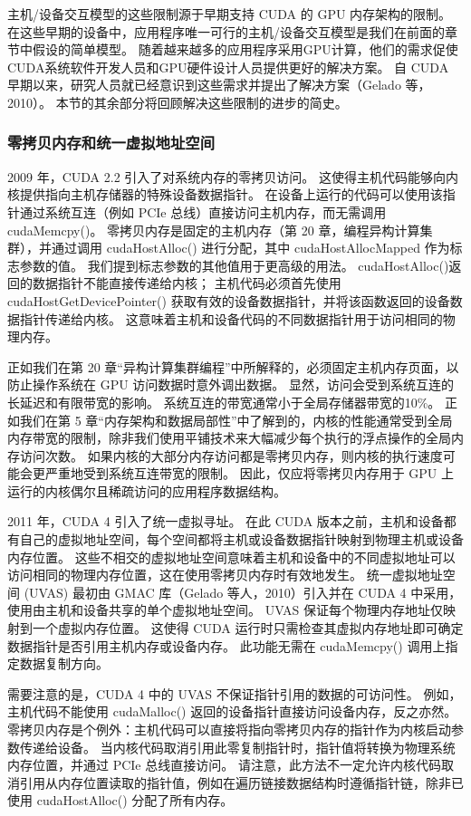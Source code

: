 主机/设备交互模型的这些限制源于早期支持 CUDA 的 GPU 内存架构的限制。 在这些早期的设备中，应用程序唯一可行的主机/设备交互模型是我们在前面的章节中假设的简单模型。 随着越来越多的应用程序采用GPU计算，他们的需求促使CUDA系统软件开发人员和GPU硬件设计人员提供更好的解决方案。 自 CUDA 早期以来，研究人员就已经意识到这些需求并提出了解决方案（Gelado 等，2010）。 本节的其余部分将回顾解决这些限制的进步的简史。

\subsubsection{零拷贝内存和统一虚拟地址空间}
2009 年，CUDA 2.2 引入了对系统内存的零拷贝访问。 这使得主机代码能够向内核提供指向主机存储器的特殊设备数据指针。 在设备上运行的代码可以使用该指针通过系统互连（例如 PCIe 总线）直接访问主机内存，而无需调用 cudaMemcpy()。 零拷贝内存是固定的主机内存（第 20 章，编程异构计算集群），并通过调用 cudaHostAlloc() 进行分配，其中 cudaHostAllocMapped 作为标志参数的值。 我们提到标志参数的其他值用于更高级的用法。 cudaHostAlloc()返回的数据指针不能直接传递给内核； 主机代码必须首先使用 cudaHostGetDevicePointer() 获取有效的设备数据指针，并将该函数返回的设备数据指针传递给内核。 这意味着主机和设备代码的不同数据指针用于访问相同的物理内存。

正如我们在第 20 章“异构计算集群编程”中所解释的，必须固定主机内存页面，以防止操作系统在 GPU 访问数据时意外调出数据。 显然，访问会受到系统互连的长延迟和有限带宽的影响。 系统互连的带宽通常小于全局存储器带宽的10\%。 正如我们在第 5 章“内存架构和数据局部性”中了解到的，内核的性能通常受到全局内存带宽的限制，除非我们使用平铺技术来大幅减少每个执行的浮点操作的全局内存访问次数。 如果内核的大部分内存访问都是零拷贝内存，则内核的执行速度可能会更严重地受到系统互连带宽的限制。 因此，仅应将零拷贝内存用于 GPU 上运行的内核偶尔且稀疏访问的应用程序数据结构。

2011 年，CUDA 4 引入了统一虚拟寻址。 在此 CUDA 版本之前，主机和设备都有自己的虚拟地址空间，每个空间都将主机或设备数据指针映射到物理主机或设备内存位置。 这些不相交的虚拟地址空间意味着主机和设备中的不同虚拟地址可以访问相同的物理内存位置，这在使用零拷贝内存时有效地发生。 统一虚拟地址空间 (UVAS) 最初由 GMAC 库（Gelado 等人，2010）引入并在 CUDA 4 中采用，使用由主机和设备共享的单个虚拟地址空间。 UVAS 保证每个物理内存地址仅映射到一个虚拟内存位置。 这使得 CUDA 运行时只需检查其虚拟内存地址即可确定数据指针是否引用主机内存或设备内存。 此功能无需在 cudaMemcpy() 调用上指定数据复制方向。

需要注意的是，CUDA 4 中的 UVAS 不保证指针引用的数据的可访问性。 例如，主机代码不能使用 cudaMalloc() 返回的设备指针直接访问设备内存，反之亦然。 零拷贝内存是个例外：主机代码可以直接将指向零拷贝内存的指针作为内核启动参数传递给设备。 当内核代码取消引用此零复制指针时，指针值将转换为物理系统内存位置，并通过 PCIe 总线直接访问。 请注意，此方法不一定允许内核代码取消引用从内存位置读取的指针值，例如在遍历链接数据结构时遵循指针链，除非已使用 cudaHostAlloc() 分配了所有内存。

